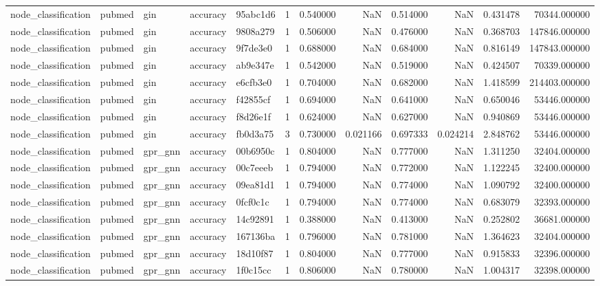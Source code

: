 \begin{tabular}{lllllrrrrrrr}
node_classification & pubmed & gin & accuracy & 95abc1d6 & 1 & 0.540000 & NaN & 0.514000 & NaN & 0.431478 & 70344.000000 \\
node_classification & pubmed & gin & accuracy & 9808a279 & 1 & 0.506000 & NaN & 0.476000 & NaN & 0.368703 & 147846.000000 \\
node_classification & pubmed & gin & accuracy & 9f7de3e0 & 1 & 0.688000 & NaN & 0.684000 & NaN & 0.816149 & 147843.000000 \\
node_classification & pubmed & gin & accuracy & ab9e347e & 1 & 0.542000 & NaN & 0.519000 & NaN & 0.424507 & 70339.000000 \\
node_classification & pubmed & gin & accuracy & e6cfb3e0 & 1 & 0.704000 & NaN & 0.682000 & NaN & 1.418599 & 214403.000000 \\
node_classification & pubmed & gin & accuracy & f42855cf & 1 & 0.694000 & NaN & 0.641000 & NaN & 0.650046 & 53446.000000 \\
node_classification & pubmed & gin & accuracy & f8d26e1f & 1 & 0.624000 & NaN & 0.627000 & NaN & 0.940869 & 53446.000000 \\
node_classification & pubmed & gin & accuracy & fb0d3a75 & 3 & 0.730000 & 0.021166 & 0.697333 & 0.024214 & 2.848762 & 53446.000000 \\
node_classification & pubmed & gpr_gnn & accuracy & 00b6950c & 1 & 0.804000 & NaN & 0.777000 & NaN & 1.311250 & 32404.000000 \\
node_classification & pubmed & gpr_gnn & accuracy & 00c7eeeb & 1 & 0.794000 & NaN & 0.772000 & NaN & 1.122245 & 32400.000000 \\
node_classification & pubmed & gpr_gnn & accuracy & 09ea81d1 & 1 & 0.794000 & NaN & 0.774000 & NaN & 1.090792 & 32400.000000 \\
node_classification & pubmed & gpr_gnn & accuracy & 0fcf0c1c & 1 & 0.794000 & NaN & 0.774000 & NaN & 0.683079 & 32393.000000 \\
node_classification & pubmed & gpr_gnn & accuracy & 14c92891 & 1 & 0.388000 & NaN & 0.413000 & NaN & 0.252802 & 36681.000000 \\
node_classification & pubmed & gpr_gnn & accuracy & 167136ba & 1 & 0.796000 & NaN & 0.781000 & NaN & 1.364623 & 32404.000000 \\
node_classification & pubmed & gpr_gnn & accuracy & 18d10f87 & 1 & 0.804000 & NaN & 0.777000 & NaN & 0.915833 & 32396.000000 \\
node_classification & pubmed & gpr_gnn & accuracy & 1f0c15cc & 1 & 0.806000 & NaN & 0.780000 & NaN & 1.004317 & 32398.000000 \\

\end{tabular}
